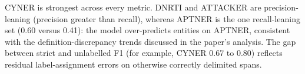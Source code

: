 CYNER is strongest across every metric. DNRTI and ATTACKER are precision-leaning (precision greater than recall), whereas APTNER is the one recall-leaning set (0.60 versus 0.41): the model over-predicts entities on APTNER, consistent with the definition-discrepancy trends discussed in the paper's analysis. The gap between strict and unlabelled F1 (for example, CYNER 0.67 to 0.80) reflects residual label-assignment errors on otherwise correctly delimited spans.
